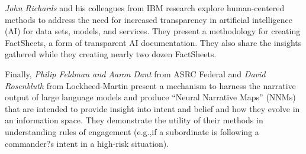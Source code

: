 \documentclass[11pt]{article}
\begin{document}
\textit{John Richards} and his colleagues from IBM research explore  human-centered methods to address the need for increased transparency in artificial intelligence (AI) for data sets, models, and services. They present a methodology for creating FactSheets, a form of transparent AI documentation. They also share the insights gathered while they creating nearly two dozen FactSheets.    

Finally, \textit{Philip Feldman and Aaron Dant} from ASRC Federal and \textit{David Rosenbluth} from Lockheed-Martin present a mechanism to harness the narrative output of large language models and produce ``Neural Narrative Maps'' (NNMs) that are intended to provide insight into intent and belief and how they evolve in an information space. They demonstrate the utility of their methods in understanding rules of engagement (e.g.,if a subordinate is following a commander?s intent in a high-risk situation).  

\end{document}
